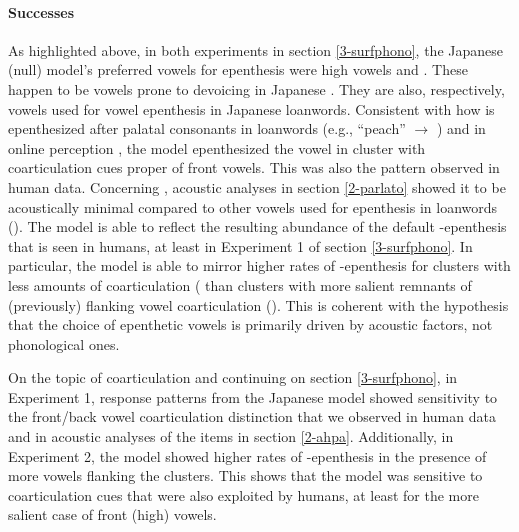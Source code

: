 {\paragraph{Successes}
As highlighted above, in both experiments in section \ref{3-surfphono}, the Japanese (null) model's preferred vowels for epenthesis were high vowels  and . These happen to be vowels prone to devoicing in Japanese \cite{han1962, vance1987}. They are also, respectively, vowels used for vowel epenthesis in Japanese loanwords. Consistent with how  is epenthesized after palatal consonants in loanwords (e.g., ``peach'' $\rightarrow$ ) and in online perception \cite{mattingley2015}, the model epenthesized the vowel  in cluster with coarticulation cues proper of front vowels. This was also the pattern observed in human data. Concerning , acoustic analyses in section \ref{2-parlato} showed it to be acoustically minimal compared to other vowels used for epenthesis in loanwords (). The model is able to reflect the resulting abundance of the default -epenthesis that is seen in humans, at least in Experiment 1 of section \ref{3-surfphono}. In particular, the model is able to mirror higher rates of -epenthesis for clusters with less amounts of coarticulation ( than clusters with more salient remnants of (previously) flanking vowel coarticulation (). This is coherent with the hypothesis that the choice of epenthetic vowels is primarily driven by acoustic factors, not phonological ones. 

On the topic of coarticulation and continuing on section \ref{3-surfphono}, in Experiment 1, response patterns from the Japanese model showed sensitivity to the front/back vowel coarticulation distinction that we observed in human data and in acoustic analyses of the items in section \ref{2-ahpa}. Additionally, in Experiment 2, the model showed higher rates of -epenthesis in the presence of more  vowels flanking the clusters. This shows that the model was sensitive to coarticulation cues that were also exploited by humans, at least for the more salient case of front (high) vowels.

}
